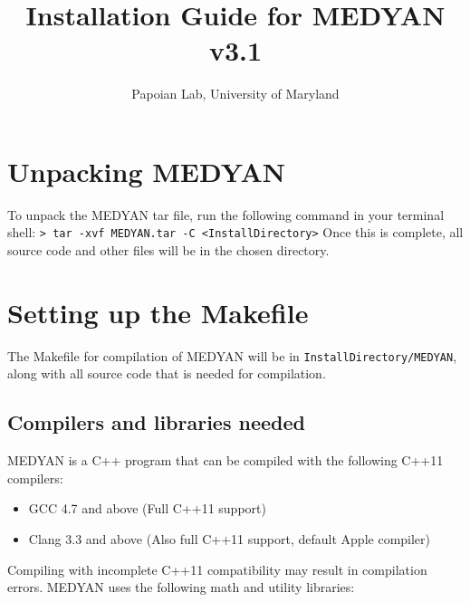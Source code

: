 \documentclass[11pt, oneside]{article}   	%
\title{Installation Guide for MEDYAN \textbf{v3.1}}
\author{Papoian Lab, University of Maryland}
\date{}							%
\begin{document}
\maketitle

\tableofcontents
\newpage

\section{Unpacking MEDYAN}
 
 To unpack the MEDYAN tar file, run the following command in your terminal shell: \newline \newline \indent\texttt{> tar -xvf MEDYAN.tar -C <InstallDirectory>} \newline \newline Once this is complete, all source code and other files will be in the chosen directory.
 
 
\section{Setting up the Makefile}

The Makefile for compilation of MEDYAN will be in \texttt{InstallDirectory/MEDYAN}, along with all source code that is needed for compilation.

\subsection {Compilers and libraries needed}

MEDYAN is a C++ program that can be compiled with the following C++11 compilers:

\begin{itemize}
\item GCC 4.7 and above (Full C++11 support)
\item  Clang 3.3 and above (Also full C++11 support, default Apple compiler)
\end{itemize}  

\noindent Compiling with incomplete C++11 compatibility may result in compilation errors. \newline MEDYAN uses the following math and utility libraries:
\end{document}
